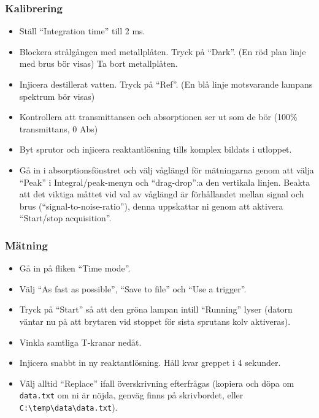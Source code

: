 \subsubsection{Kalibrering}
\begin{itemize}
\item Ställ ``Integration time'' till 2 ms.
\item Blockera strålgången med metallplåten. Tryck på ``Dark''. (En röd
  plan linje med brus bör visas) Ta bort
  metallplåten.
\item Injicera destillerat vatten. Tryck på ``Ref''. (En blå linje
  motsvarande lampans spektrum bör visas)
\item Kontrollera att transmittansen och absorptionen ser ut som de
  bör (100\% transmittans, 0 Abs)
\item Byt sprutor och injicera reaktantlösning tills komplex bildats i utloppet.
\item Gå in i absorptionsfönstret och välj våglängd
  för mätningarna genom att välja ``Peak'' i Integral/peak-menyn
  och ``drag-drop'':a den vertikala linjen. Beakta att det
  viktiga måttet vid val av våglängd är förhållandet mellan signal och brus
  (``signal-to-noise-ratio''), denna uppskattar ni genom att aktivera
  ``Start/stop acquisition''.
\end{itemize}
\subsubsection{Mätning}
\begin{itemize}
\item Gå in på fliken ``Time mode''.
\item Välj ``As fast as possible'', ``Save to file'' och ``Use a trigger''.
\item Tryck på ``Start'' så att den gröna lampan intill ``Running'' lyser
  (datorn väntar nu på att brytaren vid stoppet för sista sprutans kolv aktiveras).
\item Vinkla samtliga T-kranar nedåt.
\item Injicera snabbt in ny reaktantlösning. Håll kvar greppet i 4 sekunder.
\item Välj alltid ``Replace'' ifall överskrivning efterfrågas (kopiera
  och döpa om {\tt data.txt} om ni är nöjda, genväg finns på skrivbordet, eller {\tt
    C:\textbackslash temp\textbackslash data\textbackslash data.txt}).
\end{itemize}

